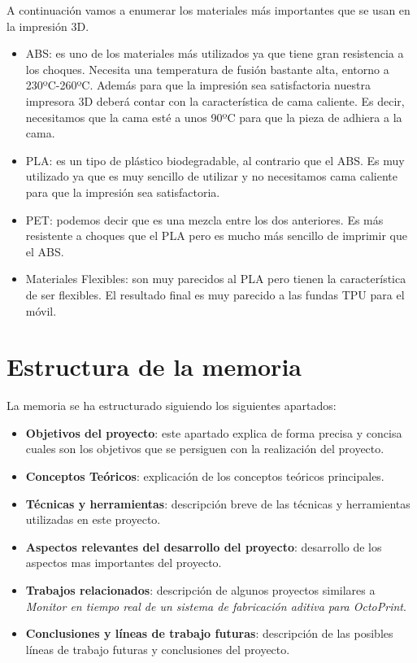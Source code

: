 A continuación vamos a enumerar los materiales más importantes que se usan en la impresión 3D.

\begin{itemize}
\item ABS: es uno de los materiales más utilizados ya que tiene gran resistencia a los choques. Necesita una temperatura de fusión bastante alta, entorno a 230ºC-260ºC. Además para que la impresión sea satisfactoria nuestra impresora 3D deberá contar con la característica de cama caliente. Es decir, necesitamos que la cama esté a unos 90ºC para que la pieza de adhiera a la cama.
\item PLA: es un tipo de plástico biodegradable, al contrario que el ABS.  Es muy utilizado ya que es muy sencillo de utilizar y no necesitamos cama caliente para que la impresión sea satisfactoria.
\item PET: podemos decir que es una mezcla entre los dos anteriores. Es más resistente a choques que el PLA pero es mucho más sencillo de imprimir que el ABS.
\item Materiales Flexibles: son muy parecidos al PLA pero tienen la característica de ser flexibles. El resultado final es muy parecido a las fundas TPU para el móvil.

\end{itemize}
\section{Estructura de la memoria}

La memoria se ha estructurado siguiendo los siguientes apartados:

\begin{itemize}
\tightlist
\item
    \textbf{Objetivos del proyecto}: este apartado explica de forma precisa y concisa cuales son los objetivos que se persiguen con la realización del proyecto.
\item
    \textbf{Conceptos Teóricos}: explicación de los conceptos teóricos principales.
\item
    \textbf{Técnicas y herramientas}: descripción breve de las técnicas y herramientas utilizadas en este proyecto.
\item
    \textbf{Aspectos relevantes del desarrollo del proyecto}: desarrollo de los aspectos mas importantes del proyecto.
\item
    \textbf{Trabajos relacionados}: descripción de algunos proyectos similares a \textit{Monitor en tiempo real de un sistema de fabricación aditiva para OctoPrint}.
\item
    \textbf{Conclusiones y líneas de trabajo futuras}: descripción de las posibles líneas de trabajo futuras y conclusiones del proyecto.
\end{itemize}

